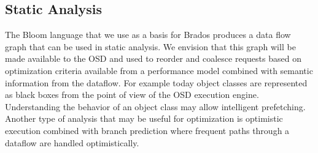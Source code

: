 \subsection{Static Analysis}

The Bloom language that we use as a basis for Brados
produces a data flow graph that can be used in static analysis. We envision
that this graph will be made available to the OSD and used to reorder and
coalesce requests based on optimization criteria available from a performance
model combined with semantic information from the dataflow. For example today
object classes are represented as black boxes from the point of view of the
OSD execution engine.  Understanding the behavior of an object class may allow
intelligent prefetching. Another type of analysis that may be useful for
optimization is optimistic execution combined with branch prediction where
frequent paths through a dataflow are handled optimistically.

